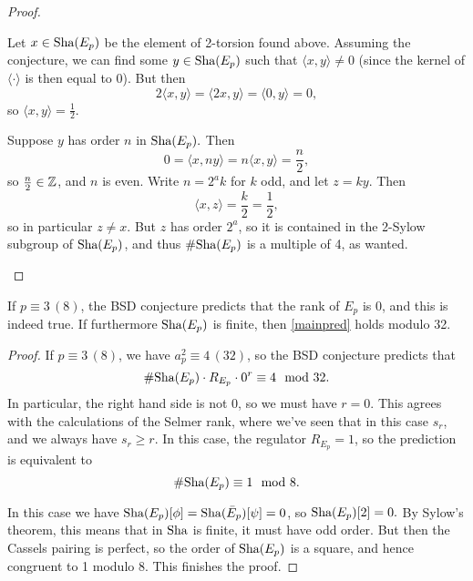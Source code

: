 \documentclass[12pt, a4paper]{report}
\begin{document}
\begin{proof}
\begin{itemize}
    Let $x \in \text{\normalfont Sha}(E_p)$ be the element of 2-torsion found above. Assuming the
    conjecture, we can find some $y \in \text{\normalfont Sha}(E_p)$ such that $\langle x,y \rangle \neq 0$
    (since the kernel of $\langle \cdot \rangle$ is then equal to 0). But then
    \[2 \langle x,y \rangle = \langle 2x,y \rangle = \langle 0, y \rangle = 0,\]
    so $\langle x,y \rangle = \frac{1}{2}.$
    
    Suppose $y$ has order $n$ in $\text{\normalfont Sha}(E_p).$ Then
    \[0 = \langle x,ny \rangle = n \langle x,y \rangle = \frac{n}{2},\]
    so $\frac{n}{2} \in {\mathbb Z}$, and $n$ is even. Write $n = 2^a k$ for $k$ odd,
    and let $z = ky$. Then
    \[\langle x,z \rangle = \frac{k}{2} = \frac{1}{2},\]
    so in particular $z \neq x$. But $z$ has order $2^a$, so it is contained in
    the 2-Sylow subgroup of $\text{\normalfont Sha}(E_p)$, and thus $\# \text{\normalfont Sha}(E_p)$ is a multiple
    of 4, as wanted.

  \end{itemize}
\end{proof}

\begin{thm} \label{mainthm1}
  If $p \equiv 3 \, (8)$, the BSD conjecture predicts
  that the rank of $E_p$ is 0, and this is indeed true. If furthermore $\text{\normalfont Sha}(E_p)$ is
  finite, then \autoref{mainpred} holds modulo 32.
\end{thm}

\begin{proof}
  If $p \equiv 3 \, (8)$, we have $a_p^2 \equiv 4 \, (32)$, 
  so the BSD conjecture predicts that
  \[\# \text{\normalfont Sha}(E_p) \cdot R_{E_p} \cdot 0^r \equiv 4 \mod{32}.\]
  In particular, the right hand side is not 0, so we must have $r = 0$. This
  agrees with the calculations of the Selmer rank, where we've seen that in this
  case $s_r$, and we always have $s_r \geq r.$ In this case, the regulator
  $R_{E_p} = 1$, so the prediction is equivalent to
  \[\# \text{\normalfont Sha}(E_p) \equiv 1 \mod{8}.\]

  In this case we have $\text{\normalfont Sha}(E_p)[\phi] = \text{\normalfont Sha}(\bar{E}_p)[\psi] = 0$, so
  $\text{\normalfont Sha}(E_p)[2] = 0.$ By Sylow's theorem, this means that in $\text{\normalfont Sha}$ is finite,
  it must have odd order. But then the Cassels pairing is perfect, so the order
  of $\text{\normalfont Sha}(E_p)$ is a square, and hence congruent to 1 modulo 8. This finishes
  the proof.
\end{proof}

\printbibliography[heading=bibintoc]
\end{document}
